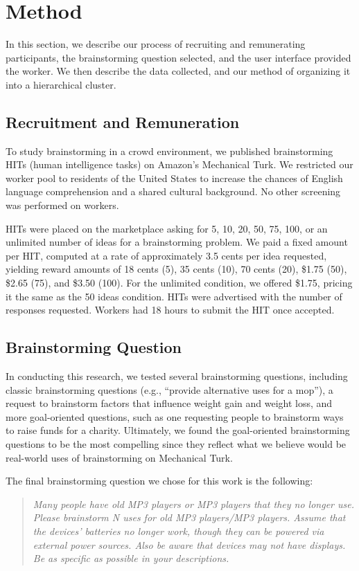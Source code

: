 \section{Method}
In this section, we describe our process of recruiting and remunerating participants, the brainstorming question selected, and the user interface provided the worker. We then describe the data collected, and our method of organizing it into a hierarchical cluster.

\subsection{Recruitment and Remuneration}
To study brainstorming in a crowd environment, we published brainstorming HITs (human intelligence tasks) on Amazon's Mechanical Turk. We restricted our worker pool to residents of the United States to increase the chances of English language comprehension and a shared cultural background. No other screening was performed on workers.

HITs were placed on the marketplace asking for 5, 10, 20, 50, 75, 100, or an unlimited number of ideas for a brainstorming problem. We paid a fixed amount per HIT, computed at a rate of approximately 3.5 cents per idea requested, yielding reward amounts of 18 cents (5), 35 cents (10), 70 cents (20), \$1.75 (50), \$2.65 (75), and \$3.50 (100). For the unlimited condition, we offered \$1.75, pricing it the same as the 50 ideas condition. HITs were advertised with the number of responses requested. Workers had 18 hours to submit the HIT once accepted.

\subsection{Brainstorming Question}
In conducting this research, we tested several brainstorming questions, including classic brainstorming questions (e.g., ``provide alternative uses for a mop''), a request to brainstorm factors that influence weight gain and weight loss, and more goal-oriented questions, such as one requesting people to brainstorm ways to raise funds for a charity. Ultimately, we found the goal-oriented brainstorming questions to be the most compelling since they reflect what we believe would be real-world uses of brainstorming on Mechanical Turk.

The final brainstorming question we chose for this work is the following:
\begin{quote}
{\em Many people have old MP3 players or MP3 players that they no longer use. Please brainstorm N uses for old MP3 players/MP3 players. Assume that the devices' batteries no longer work, though they can be powered via external power sources. Also be aware that devices may {\em not \/} have displays. Be as specific as possible in your descriptions.\/}
\end{quote}


